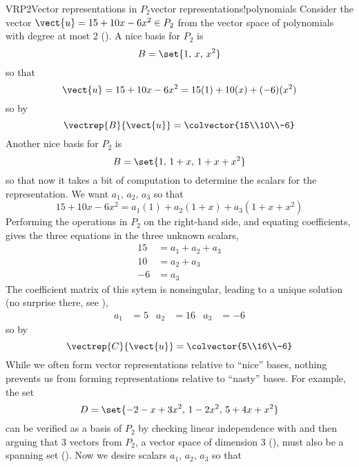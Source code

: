 \begin{example}{VRP2}{Vector representations in $P_2$}{vector representations!polynomials}
Consider the vector $\vect{u}=15+10x-6x^2\in P_2$ from the vector space of polynomials with degree at most 2 ().  A nice basis for $P_2$ is
%
\begin{equation*}
B=\set{1,\,x,\,x^2}
\end{equation*}
%
so that 
%
\begin{equation*}
\vect{u}=15+10x-6x^2=15(1)+10(x)+(-6)(x^2)
\end{equation*}
%
so by 
%
\begin{equation*}
\vectrep{B}{\vect{u}}=\colvector{15\\10\\-6}
\end{equation*}
%
Another nice basis for $P_2$ is
%
\begin{equation*}
B=\set{1,\,1+x,\,1+x+x^2}
\end{equation*}
%
so that now it takes a bit of computation to determine the scalars for the representation.  We want $a_1,\,a_2,\,a_3$ so that
%
\begin{equation*}
15+10x-6x^2=a_1(1)+a_2(1+x)+a_3(1+x+x^2)
\end{equation*}
%
Performing the operations in $P_2$ on the right-hand side, and equating coefficients, gives the three equations in the three unknown scalars,
%
\begin{align*}
15&=a_1+a_2+a_3\\
10&=a_2+a_3\\
-6&=a_3
\end{align*}
%
The coefficient matrix of this sytem is nonsingular, leading to a unique solution (no surprise there, see ),
%
\begin{align*}
a_1&=5&a_2&=16&a_3&=-6
\end{align*}
%
so by 
%
\begin{equation*}
\vectrep{C}{\vect{u}}=\colvector{5\\16\\-6}
\end{equation*}
%
While we often form vector representations relative to ``nice'' bases, nothing prevents us from forming representations relative to ``nasty'' bases.  For example, the set
%
\begin{equation*}
D=\set{
-2-x+3x^2,\,
1-2x^2,\,
5+4x+x^2
}
\end{equation*}
%
can be verified as a basis of $P_2$ by checking linear independence with  and then arguing that 3 vectors from $P_2$, a vector space of dimension 3 (), must also be a spanning set ().  Now we desire scalars $a_1,\,a_2,\,a_3$ so that

\end{example}
